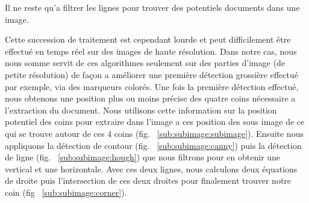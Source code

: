 Il ne reste qu'a filtrer les lignes pour trouver des potentiels documents dans une image.

Cette succession de traitement est cependant lourde et peut difficilement être effectué en temps réel sur des images de haute résolution. 
Dans notre cas, nous nous somme servit de ces algorithmes seulement sur des parties d'image (de petite résolution) de façon a améliorer une première détection grossière effectué par exemple, via des marqueurs colorés. Une fois la première détection effectué, nous obtenons une position plus ou moins précise des quatre coins nécessaire a l'extraction du document.
Nous utilisons cette information sur la position potentiel des coins pour extraire dans l'image a ces position des sous image de ce qui se trouve autour de ces 4 coins (fig. ~\ref{sub:subimage:subimage}). Ensuite nous appliquons la détection de contour (fig. ~\ref{sub:subimage:canny}) puis la détection de ligne (fig. ~\ref{sub:subimage:hough}) que nous filtrons pour en obtenir une vertical et une horizontale. Avec ces deux lignes, nous calculons deux équations de droite puis l'intersection de ces deux droites pour finalement trouver notre coin (fig ~\ref{sub:subimage:corner}).

